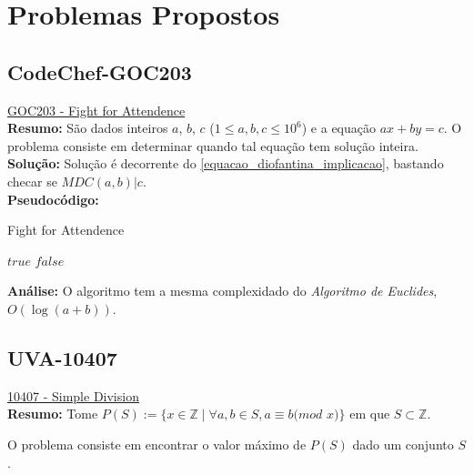 \section{Problemas Propostos}


\subsection{CodeChef-GOC203}
\href{https://www.codechef.com/problems/GOC203}{GOC203 - Fight for Attendence}\\

\textbf{Resumo:}
São dados inteiros $a$, $b$, $c$ ($1 \leq a, b, c \leq 10^6$) e a equação $ax+by=c$. O problema consiste em determinar 
quando tal equação tem solução inteira.
\\

\textbf{Solução:}
Solução é decorrente do \autoref{equacao_diofantina_implicacao}, bastando checar se $MDC(a,b)|c$.
\\

\textbf{Pseudocódigo:}
\begin{algorithm}
\caption{Fight for Attendence}
\begin{algorithmic}[1]
\State \Return $true$
\EndIf
\State \Return $false$
\EndProcedure
\end{algorithmic}
\end{algorithm}

\textbf{Análise:}
O algoritmo tem a mesma complexidado do \textit{Algoritmo de Euclides}, $O(\log{(a+b)})$. 



\subsection{UVA-10407}
\href{https://uva.onlinejudge.org/index.php?option=onlinejudge&page=show_problem&problem=1348}{10407 - Simple Division} \\

\textbf{Resumo:} 
Tome $P(S) := \{ x \in \mathbb{Z} \mid  \forall a , b \in S , a \equiv b ( mod$ $x)\}$ em que $S \subset \mathbb{Z}$.

O problema consiste em encontrar o valor máximo de $P(S)$ dado um conjunto $S$.
\\

